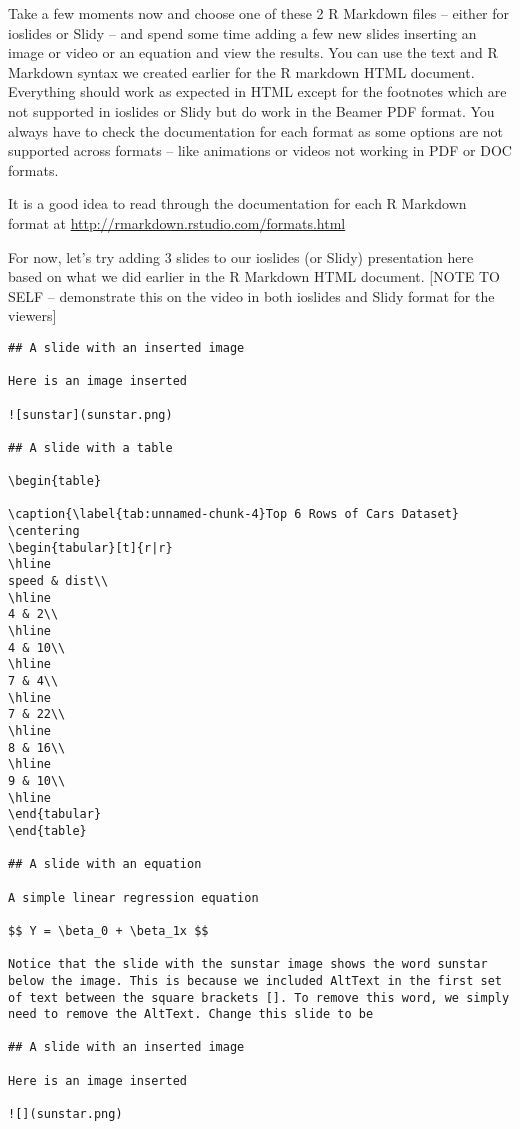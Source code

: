 \documentclass[]{book}
\theoremstyle{definition}
\theoremstyle{definition}
\theoremstyle{definition}
\theoremstyle{remark}
\begin{document}
Take a few moments now and choose one of these 2 R Markdown files --
either for ioslides or Slidy -- and spend some time adding a few new
slides inserting an image or video or an equation and view the results.
You can use the text and R Markdown syntax we created earlier for the R
markdown HTML document. Everything should work as expected in HTML
except for the footnotes which are not supported in ioslides or Slidy
but do work in the Beamer PDF format. You always have to check the
documentation for each format as some options are not supported across
formats -- like animations or videos not working in PDF or DOC formats.

It is a good idea to read through the documentation for each R Markdown
format at \url{http://rmarkdown.rstudio.com/formats.html}

For now, let's try adding 3 slides to our ioslides (or Slidy)
presentation here based on what we did earlier in the R Markdown HTML
document. {[}NOTE TO SELF -- demonstrate this on the video in both
ioslides and Slidy format for the viewers{]}

\begin{verbatim}
## A slide with an inserted image

Here is an image inserted

![sunstar](sunstar.png)

## A slide with a table

\begin{table}

\caption{\label{tab:unnamed-chunk-4}Top 6 Rows of Cars Dataset}
\centering
\begin{tabular}[t]{r|r}
\hline
speed & dist\\
\hline
4 & 2\\
\hline
4 & 10\\
\hline
7 & 4\\
\hline
7 & 22\\
\hline
8 & 16\\
\hline
9 & 10\\
\hline
\end{tabular}
\end{table}

## A slide with an equation

A simple linear regression equation

$$ Y = \beta_0 + \beta_1x $$

Notice that the slide with the sunstar image shows the word sunstar below the image. This is because we included AltText in the first set of text between the square brackets []. To remove this word, we simply need to remove the AltText. Change this slide to be

## A slide with an inserted image

Here is an image inserted

![](sunstar.png)
\end{verbatim}
\end{document}
